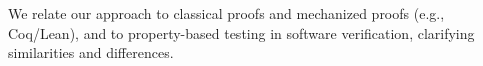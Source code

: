 We relate our approach to classical proofs and mechanized proofs (e.g., Coq/Lean), and to property-based testing in software verification, clarifying similarities and differences.

